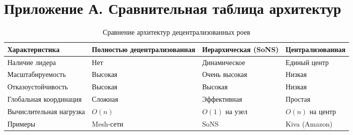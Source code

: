 \documentclass[12pt, a4paper]{article}
\begin{document}
\section{Приложение А. Сравнительная таблица архитектур}
\begin{table}[H]
    \centering
    \caption{Сравнение архитектур децентрализованных роев}
    \begin{tabular}{|p{4cm}|p{3cm}|p{3cm}|p{3cm}|}
        \hline
        \textbf{Характеристика} & \textbf{Полностью децентрализованная} & \textbf{Иерархическая (SoNS)} & \textbf{Централизованная} \\
        \hline
        Наличие лидера & Нет & Динамическое & Единый центр \\
        \hline
        Масштабируемость & Высокая & Очень высокая & Низкая \\
        \hline
        Отказоустойчивость & Высокая & Высокая & Низкая \\
        \hline
        Глобальная координация & Сложная & Эффективная & Простая \\
        \hline
        Вычислительная нагрузка & $O(n)$ & $O(1)$ на узел & $O(n)$ на центр \\
        \hline
        Примеры & Mesh-сети & SoNS & Kiva (Amazon) \\
        \hline
    \end{tabular}
    \label{tab:comparison}
\end{table}
\end{document}
